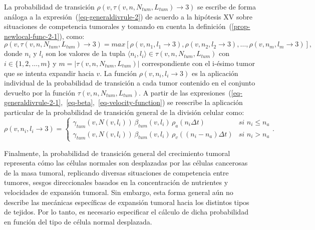 La probabilidad de transici\'on $\rho(v,\tau(v,n,N_{tum},L_{tum}) \rightarrow 3)$ se escribe de forma an\'aloga a la expresi\'on~(\ref{eq-generaldivrule-2}) de acuerdo a la hip\'otesis XV sobre situaciones de competencia tumorales y tomando en cuenta la definici\'on~(\ref{prop-newlocal-func-2-1}), como:
\begin{equation}
\rho(v,\tau(v,n,N_{tum},L_{tum}) \rightarrow 3) = max\left[\rho(v, n_1, l_1 \rightarrow 3),\rho(v, n_2, l_2 \rightarrow 3),\ldots, \rho(v, n_m, l_m \rightarrow 3)\right], \label{eq-generaldivrule-2-1}
\end{equation}
donde $n_i$ y $l_i$ son los valores de la tupla $\langle n_i, l_i \rangle \in \tau(v,n,N_{tum},L_{tum})$ con $i \in \lbrace 1,2,\ldots,m \rbrace$ y $m=|\tau(v,n,N_{tum},L_{tum})|$ correspondiente con el i-\'esimo tumor que se intenta expandir hacia $v$. La funci\'on $\rho(v, n_i, l_i \rightarrow 3)$ es la aplicaci\'on individual de la probabilidad de transici\'on a cada tumor contenido en el conjunto devuelto por la funci\'on $\tau(v,n,N_{tum},L_{tum})$. A partir de las expresiones~(\ref{eq-generaldivrule-2-1},~\ref{eq-beta},~\ref{eq-velocity-function}) se reescribe la aplicaci\'on particular de la probabilidad de transici\'on general de la divisi\'on celular como:
\begin{equation}
\rho(v,n_i,l_i \rightarrow 3) = \left\lbrace
	\begin{array}{ll}
		\gamma_{tum}(v,N(v,l_i))\,\beta_{tum}(v,l_i)\,\rho_a(n_i \Delta t)& \textit{si } n_i \leq n_a \\
		\gamma_{tum}(v,N(v,l_i))\,\beta_{tum}(v,l_i)\,\rho_v((n_i - n_a) \Delta t)& \textit{si } n_i > n_a
	\end{array}
\right.. \label{eq-generaldivrule-2-2}
\end{equation}

Finalmente, la probabilidad de transición general del crecimiento tumoral representa cómo las células normales son desplazadas por las células cancerosas de la masa tumoral, replicando diversas situaciones de competencia entre tumores, sesgos direccionales basados en la concentración de nutrientes y velocidades de expansión tumoral. Sin embargo, esta forma general aún no describe las mecánicas específicas de expansión tumoral hacia los distintos tipos de tejidos. Por lo tanto, es necesario especificar el cálculo de dicha probabilidad en función del tipo de célula normal desplazada.

